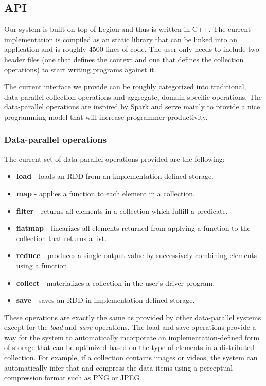 \documentclass[tog]{acmsiggraph}
\begin{document}
\subsection{API}

Our system is built on top of Legion and thus is written in C++. The current
implementation is compiled as an static library that can be linked into an
application and is roughly 4500 lines of code. The user only needs to include
two header files (one that defines the context and one that defines the
collection operations) to start writing programs against it.

The current interface we provide can be roughly categorized into traditional,
data-parallel collection operations and aggregate, domain-specific
operations. The data-parallel operations are inspired by Spark and serve mainly
to provide a nice programming model that will increase programmer productivity.

\subsubsection{Data-parallel operations}
The current set of data-parallel operations provided are the following:

\begin{itemize}
\item \textbf{load} - loads an RDD from an implementation-defined storage.
\item \textbf{map} - applies a function to each element in a collection.
\item \textbf{filter} - returns all elements in a collection which fulfill a
predicate.
\item \textbf{flatmap} - linearizes all elements returned from applying a
  function to the collection that returns a list.
\item \textbf{reduce} - produces a single output value by successively combining
  elements using a function.
\item \textbf{collect} - materializes a collection in the user's driver program.
\item \textbf{save} - saves an RDD in implementation-defined storage.
\end{itemize}

These operations are exactly the same as provided by other data-parallel
systems except for the \textit{load} and \textit{save} operations. The load and
save operations provide a way for the system to automatically incorporate an
implementation-defined form of storage that can be optimized based on the type
of elements in a distributed collection. For example, if a collection contains
images or videos, the system can automatically infer that and compress the data
items using a perceptual compression format such as PNG or JPEG.
\end{document}
